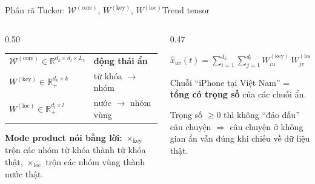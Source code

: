 \begin{frame}{Phân rã Tucker: $\mathcal W^{(\mathrm{core})}$, $W^{(\mathrm{key})}$, $W^{(\mathrm{loc})}$}{Trend tensor}
\vspace{2mm}
\begin{columns}[T,onlytextwidth]
\begin{column}{0.50\textwidth}
\begin{questioncard}
\small
\begin{tabular}{@{}l@{\;}l@{}}
  $\mathcal W^{(\mathrm{core})}\in\mathbb R^{d_k\times d_l\times L_c}$ & \textbf{động thái ẩn} \\[1mm]
  $W^{(\mathrm{key})}\in\mathbb R_+^{d_k\times k}$ & từ khóa $\to$ nhóm \\[1mm]
  $W^{(\mathrm{loc})}\in\mathbb R_+^{d_l\times l}$ & nước $\to$ nhóm vùng
\end{tabular}
\end{questioncard}

\vspace{3mm}
\textbf{Mode product nói bằng lời:}
$\times_{\mathrm{key}}$ trộn các nhóm từ khóa thành từ khóa thật,
$\times_{\mathrm{loc}}$ trộn các nhóm vùng thành nước thật.
\end{column}
\begin{column}{0.47\textwidth}
\begin{intuition}
  \centering
  $\displaystyle \hat x_{uv}(t)=\sum_{i=1}^{d_k}\sum_{j=1}^{d_l}
  W^{(\mathrm{key})}_{iu}\,W^{(\mathrm{loc})}_{jv}\,w_{ij}(t)$\par
  \vspace{1mm}
  \raggedright\small Chuỗi ``iPhone tại Việt Nam'' = \textbf{tổng có trọng số} của các chuỗi ẩn.
\end{intuition}
\vspace{2mm}
\begin{takeaway}
  \small Trọng số $\ge 0$ thì không ``đảo dấu'' câu chuyện $\Rightarrow$ câu chuyện ở không gian ẩn vẫn đúng khi chiếu về dữ liệu thật.
\end{takeaway}
\end{column}
\end{columns}
\vfill
{}
\end{frame}

